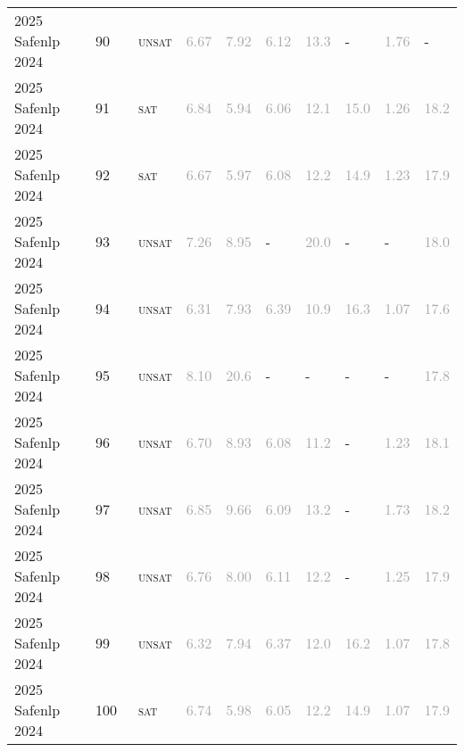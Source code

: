 \begin{center}
{\begin{longtable}{@{}llllllllll@{}}
2025 Safenlp 2024 & 90 & ~\textsc{unsat} & \textcolor{darkgray}{6.67} & \textcolor{darkgray}{7.92} & \textcolor{darkgray}{6.12} & \textcolor{darkgray}{13.3} & - & \textcolor{darkgray}{1.76} & - \\
2025 Safenlp 2024 & 91 & ~\textsc{sat} & \textcolor{darkgray}{6.84} & \textcolor{darkgray}{5.94} & \textcolor{darkgray}{6.06} & \textcolor{darkgray}{12.1} & \textcolor{darkgray}{15.0} & \textcolor{darkgray}{1.26} & \textcolor{darkgray}{18.2} \\
2025 Safenlp 2024 & 92 & ~\textsc{sat} & \textcolor{darkgray}{6.67} & \textcolor{darkgray}{5.97} & \textcolor{darkgray}{6.08} & \textcolor{darkgray}{12.2} & \textcolor{darkgray}{14.9} & \textcolor{darkgray}{1.23} & \textcolor{darkgray}{17.9} \\
2025 Safenlp 2024 & 93 & ~\textsc{unsat} & \textcolor{darkgray}{7.26} & \textcolor{darkgray}{8.95} & - & \textcolor{darkgray}{20.0} & - & - & \textcolor{darkgray}{18.0} \\
2025 Safenlp 2024 & 94 & ~\textsc{unsat} & \textcolor{darkgray}{6.31} & \textcolor{darkgray}{7.93} & \textcolor{darkgray}{6.39} & \textcolor{darkgray}{10.9} & \textcolor{darkgray}{16.3} & \textcolor{darkgray}{1.07} & \textcolor{darkgray}{17.6} \\
2025 Safenlp 2024 & 95 & ~\textsc{unsat} & \textcolor{darkgray}{8.10} & \textcolor{darkgray}{20.6} & - & - & - & - & \textcolor{darkgray}{17.8} \\
2025 Safenlp 2024 & 96 & ~\textsc{unsat} & \textcolor{darkgray}{6.70} & \textcolor{darkgray}{8.93} & \textcolor{darkgray}{6.08} & \textcolor{darkgray}{11.2} & - & \textcolor{darkgray}{1.23} & \textcolor{darkgray}{18.1} \\
2025 Safenlp 2024 & 97 & ~\textsc{unsat} & \textcolor{darkgray}{6.85} & \textcolor{darkgray}{9.66} & \textcolor{darkgray}{6.09} & \textcolor{darkgray}{13.2} & - & \textcolor{darkgray}{1.73} & \textcolor{darkgray}{18.2} \\
2025 Safenlp 2024 & 98 & ~\textsc{unsat} & \textcolor{darkgray}{6.76} & \textcolor{darkgray}{8.00} & \textcolor{darkgray}{6.11} & \textcolor{darkgray}{12.2} & - & \textcolor{darkgray}{1.25} & \textcolor{darkgray}{17.9} \\
2025 Safenlp 2024 & 99 & ~\textsc{unsat} & \textcolor{darkgray}{6.32} & \textcolor{darkgray}{7.94} & \textcolor{darkgray}{6.37} & \textcolor{darkgray}{12.0} & \textcolor{darkgray}{16.2} & \textcolor{darkgray}{1.07} & \textcolor{darkgray}{17.8} \\
2025 Safenlp 2024 & 100 & ~\textsc{sat} & \textcolor{darkgray}{6.74} & \textcolor{darkgray}{5.98} & \textcolor{darkgray}{6.05} & \textcolor{darkgray}{12.2} & \textcolor{darkgray}{14.9} & \textcolor{darkgray}{1.07} & \textcolor{darkgray}{17.9} \\

\end{longtable}}
\end{center}
